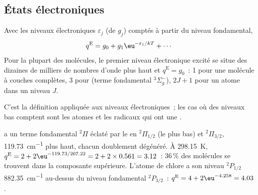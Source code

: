 \subsection*{États électroniques}

\begin{proposition}\label{prop:b3:partition-functions:q-elec}
Avec les niveaux électroniques $\varepsilon_j$ (de  $g_j$)
comptés à partir du niveau
fondamental,
\[
  q^{\mathrm E} = g_0 + g_1\eu^{-\varepsilon_1/kT} + \cdots
\]
Pour la plupart des molécules, le premier niveau électronique excité se
situe des dizaines de milliers de nombres d'onde plus haut et
$q^{\mathrm E} = g_0$~: 1 pour une molécule à couches complètes, 3 pour
 (terme fondamental ${}^3\Sigma_g^-$), $2J + 1$ pour un atome
dans un niveau $J$.
\end{proposition}

C'est la définition appliquée aux niveaux électroniques~; les cas où des
niveaux bas comptent sont les atomes et les radicaux qui ont une
.

\begin{example}\label{ex:b3:partition-functions:no-cl}
 a un terme fondamental ${}^2\Pi$ éclaté par le  en ${}^2\Pi_{1/2}$ (le plus bas)
et ${}^2\Pi_{3/2}$, \qty{119.73}{cm^{-1}} plus haut, chacun doublement
dégénéré. À \qty{298.15}{K},
$q^{\mathrm E} = 2 + 2\eu^{-119.73/207.22} = 2 + 2\times0.561 = 3.12$~: 36\,\% des molécules
se trouvent dans la composante supérieure. L'atome de chlore a son
niveau ${}^2P_{1/2}$ \qty{882.35}{cm^{-1}}
au-dessus du niveau fondamental ${}^2P_{3/2}$~: $q^{\mathrm E} = 4 + 2\eu^{-4.258} = 4.03$.
\end{example}

